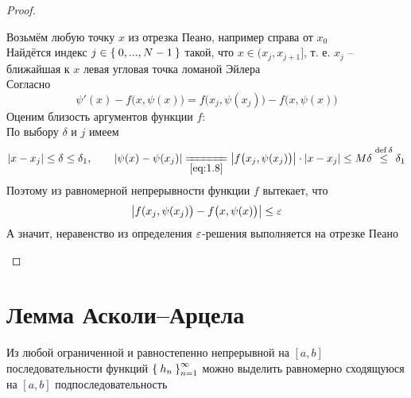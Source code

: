 \begin{proof}
\begin{enumerate}
        Возьмём любую точку $ x $ из отрезка Пеано, например справа от $ x_0 $ \\
        Найдётся индекс $ j \in \Set{0, ..., N - 1} $ такой, что $ x \in (x_j, x_{j + 1}] $, т. е. $ x_j $ -- ближайшая к $ x $ левая угловая точка ломаной Эйлера \\
        Согласно 
        $$ \psi'(x) - f \big(x, \psi(x) \big) = f \big( x_j, \psi(x_j) \big) - f \big( x, \psi(x) \big) $$
        Оценим близость аргументов функции $ f $: \\
        По выбору $ \delta $ и $ j $ имеем
        $$ |x - x_j| \le \delta \le \delta_1, \qquad |\psi(x) - \psi(x_j)| \undereq{\eref{1.8}} \big| f \big( x_j, \psi(x_j) \big) \big| \cdot |x - x_j| \le M\delta \bdef[\le]\delta \delta_1 $$
        Поэтому из равномерной непрерывности функции $ f $ вытекает, что
        $$ \big| f(x_j, \psi(x_j) \big) - f \big( x, \psi(x) \big) \big| \le \varepsilon $$
        А значит, неравенство  из определения $ \varepsilon $-решения выполняется на отрезке Пеано
    \end{enumerate}
\end{proof}

\section{Лемма Асколи--Арцела}

\begin{lemma}
    Из любой ограниченной и равностепенно непрерывной на $ [a, b] $ последовательности функций $ \Set{h_n}_{n=1}^{\infty} $ можно выделить равномерно сходящуюся на $ [a, b] $ подпоследовательность
\end{lemma}

